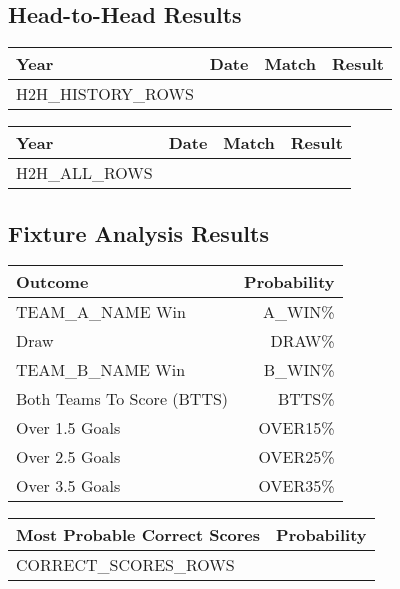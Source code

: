 \documentclass[a4paper,12pt]{article}
\begin{document}
\subsection*{Head-to-Head Results}
\begin{tabular}{lllr}
  \toprule
  Year & Date & Match & Result \\
  \midrule
  {{H2H_HISTORY_ROWS}}
  \bottomrule
\end{tabular}

\vspace{0.5cm}
\begin{tabular}{lllr}
  \toprule
  Year & Date & Match & Result \\
  \midrule
  {{H2H_ALL_ROWS}}
  \bottomrule
\end{tabular}

\subsection*{Fixture Analysis Results}
\begin{tabular}{lr}
  \toprule
  Outcome & Probability \\
  \midrule
  {{TEAM_A_NAME}} Win & {{A_WIN}}\% \\
  Draw & {{DRAW}}\% \\
  {{TEAM_B_NAME}} Win & {{B_WIN}}\% \\
  Both Teams To Score (BTTS) & {{BTTS}}\% \\
  Over 1.5 Goals & {{OVER15}}\% \\
  Over 2.5 Goals & {{OVER25}}\% \\
  Over 3.5 Goals & {{OVER35}}\% \\
  \bottomrule
\end{tabular}

\vspace{0.5cm}
\begin{tabular}{lr}
  \toprule
  Most Probable Correct Scores & Probability \\
  \midrule
  {{CORRECT_SCORES_ROWS}}
  \bottomrule
\end{tabular}
\end{document}
